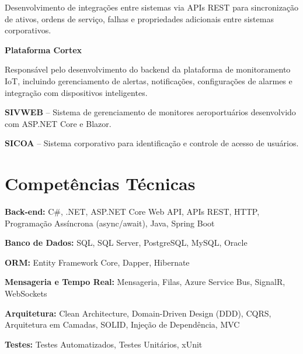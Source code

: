 \documentclass[11pt,a4paper]{article}
\begin{document}
Desenvolvimento de integrações entre sistemas via APIs REST para sincronização de ativos, ordens de serviço, falhas e propriedades adicionais entre sistemas corporativos.

\vspace{0.2cm}

\textbf{Plataforma Cortex}

Responsável pelo desenvolvimento do backend da plataforma de monitoramento IoT, incluindo gerenciamento de alertas, notificações, configurações de alarmes e integração com dispositivos inteligentes.

\vspace{0.2cm}

\textbf{SIVWEB} -- Sistema de gerenciamento de monitores aeroportuários desenvolvido com ASP.NET Core e Blazor.

\vspace{0.2cm}

\textbf{SICOA} -- Sistema corporativo para identificação e controle de acesso de usuários.

\section{Competências Técnicas}

\textbf{Back-end:} C\#, .NET, ASP.NET Core Web API, APIs REST, HTTP, Programação Assíncrona (async/await), Java, Spring Boot

\vspace{0.12cm}

\textbf{Banco de Dados:} SQL, SQL Server, PostgreSQL, MySQL, Oracle

\vspace{0.12cm}

\textbf{ORM:} Entity Framework Core, Dapper, Hibernate

\vspace{0.12cm}

\textbf{Mensageria e Tempo Real:} Mensageria, Filas, Azure Service Bus, SignalR, WebSockets

\vspace{0.12cm}

\textbf{Arquitetura:} Clean Architecture, Domain-Driven Design (DDD), CQRS, Arquitetura em Camadas, SOLID, Injeção de Dependência, MVC

\vspace{0.12cm}

\textbf{Testes:} Testes Automatizados, Testes Unitários, xUnit
\end{document}

